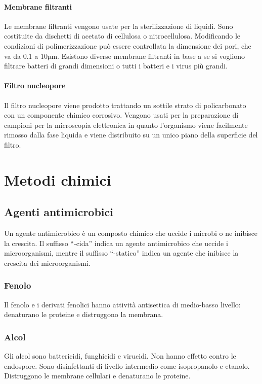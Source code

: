 			\paragraph{Membrane filtranti}
			Le membrane filtranti vengono usate per la sterilizzazione di liquidi.
			Sono costituite da dischetti di acetato di cellulosa o nitrocellulosa.
			Modificando le condizioni di polimerizzazione pu\`o essere controllata la dimensione dei pori, che va da $0.1$ a $10\si{\micro\metre}$.
			Esistono diverse membrane filtranti in base a se si vogliono filtrare batteri di grandi dimensioni o tutti i batteri e i virus pi\`u grandi.

			\paragraph{Filtro nucleopore}
			Il filtro nucleopore viene prodotto trattando un sottile strato di policarbonato con un componente chimico corrosivo.
			Vengono usati per la preparazione di campioni per la microscopia elettronica in quanto l'organismo viene facilmente rimosso dalla fase liquida e viene distribuito su un unico piano della superficie del filtro.
\section{Metodi chimici}
	
	\subsection{Agenti antimicrobici}
	Un agente antimicrobico \`e un composto chimico che uccide i microbi o ne inibisce la crescita.
	Il suffisso ``-cida'' indica un agente antimicrobico che uccide i microorganismi, mentre il suffisso ``-statico'' indica un agente che inibisce la crescita dei microorganismi.
	
		\subsubsection{Fenolo}
		Il fenolo e i derivati fenolici hanno attivit\`a antisettica di medio-basso livello: denaturano le proteine e distruggono la membrana.

		\subsubsection{Alcol}
		Gli alcol sono battericidi, funghicidi e virucidi.
		Non hanno effetto contro le endospore.
		Sono disinfettanti di livello intermedio come isopropanolo e etanolo.
		Distruggono le membrane cellulari e denaturano le proteine.


